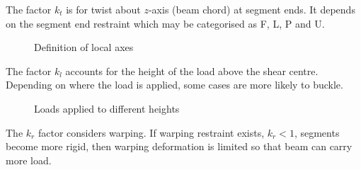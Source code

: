 The factor $k_t$ is for twist about $z$-axis (beam chord) at segment ends.
It depends on the segment end restraint which may be categorised as F, L, P and U.
\begin{figure}[H]
\centering
\caption{Definition of local axes}
\end{figure}

The factor $k_l$ accounts for the height of the load above the shear centre.
Depending on where the load is applied, some cases are more likely to buckle.
\begin{figure}[H]
\centering
\caption{Loads applied to different heights}
\end{figure}

The $k_r$ factor considers warping.
If warping restraint exists, $k_r<1$, segments become more rigid, then warping deformation is limited so that beam can carry more load.

